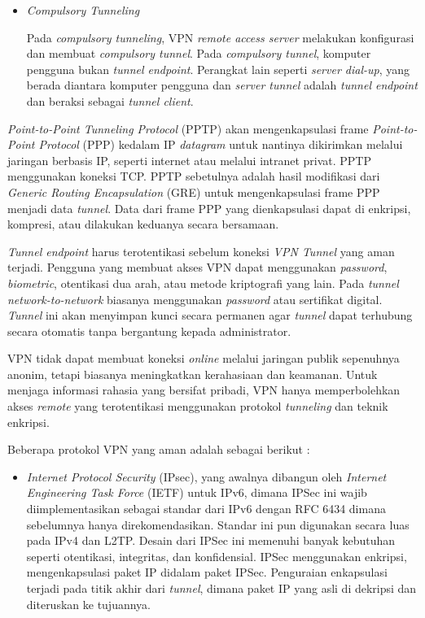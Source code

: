 \documentclass[pdftex,12pt, oneside]{article}
\begin{document}
\begin{enumerate}
\begin{enumerate}
\begin{itemize}
    \item \textit{Compulsory Tunneling}
    
    Pada \textit{compulsory tunneling}, VPN \textit{remote access server} melakukan konfigurasi dan membuat \textit{compulsory tunnel}. Pada \textit{compulsory tunnel}, komputer pengguna bukan \textit{tunnel endpoint}. Perangkat lain seperti \textit{server dial-up}, yang berada diantara komputer pengguna dan \textit{server tunnel} adalah \textit{tunnel endpoint} dan beraksi sebagai \textit{tunnel client}.
  \end{itemize}
  
  \textit{Point-to-Point Tunneling Protocol} (PPTP) akan mengenkapsulasi frame \textit{Point-to-Point Protocol} (PPP) kedalam IP \textit{datagram} untuk nantinya dikirimkan melalui jaringan berbasis IP, seperti internet atau melalui intranet privat. PPTP menggunakan koneksi TCP. PPTP sebetulnya adalah hasil modifikasi dari \textit{Generic Routing Encapsulation} (GRE) untuk mengenkapsulasi frame PPP menjadi data \textit{tunnel}. Data dari frame PPP yang dienkapsulasi dapat di enkripsi, kompresi, atau dilakukan keduanya secara bersamaan.
  
  \textit{Tunnel endpoint} harus terotentikasi sebelum koneksi \textit{VPN Tunnel} yang aman terjadi. Pengguna yang membuat akses VPN dapat menggunakan \textit{password}, \textit{biometric}, otentikasi dua arah, atau metode kriptografi yang lain. Pada \textit{tunnel network-to-network} biasanya menggunakan \textit{password} atau sertifikat digital. \textit{Tunnel} ini akan menyimpan kunci secara permanen agar \textit{tunnel} dapat terhubung secara otomatis tanpa bergantung kepada administrator.
  
  VPN tidak dapat membuat koneksi \textit{online} melalui jaringan publik sepenuhnya anonim, tetapi biasanya meningkatkan kerahasiaan dan keamanan. Untuk menjaga informasi rahasia yang bersifat pribadi, VPN hanya memperbolehkan akses \textit{remote} yang terotentikasi menggunakan protokol \textit{tunneling} dan teknik enkripsi.
  
  Beberapa protokol VPN yang aman adalah sebagai berikut :
  
  \begin{itemize}
    \item \textit{Internet Protocol Security} (IPsec), yang awalnya dibangun oleh \textit{Internet Engineering Task Force} (IETF) untuk IPv6, dimana IPSec ini wajib diimplementasikan sebagai standar dari IPv6 dengan RFC 6434 dimana sebelumnya hanya direkomendasikan. Standar ini pun digunakan secara luas pada IPv4 dan L2TP. Desain dari IPSec ini memenuhi banyak kebutuhan seperti otentikasi, integritas, dan konfidensial. IPSec menggunakan enkripsi, mengenkapsulasi paket IP didalam paket IPSec. Penguraian enkapsulasi terjadi pada titik akhir dari \textit{tunnel}, dimana paket IP yang asli di dekripsi dan diteruskan ke tujuannya.
    

\end{itemize}
\end{enumerate}
\end{enumerate}
\end{document}
